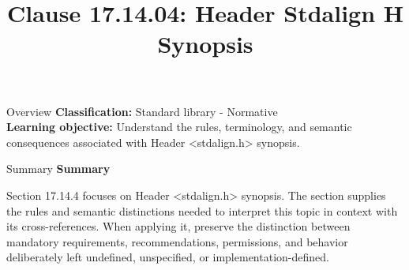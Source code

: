 \documentclass[10pt,letterpaper]{article}
\title{Clause 17.14.04: Header Stdalign H Synopsis}
\author{}
\date{}
\begin{document}
\maketitle
\begin{CornellOverviewBox}{Overview}
\textbf{Classification:} Standard library - Normative\\[2pt]
\textbf{Learning objective:} Understand the rules, terminology, and semantic consequences associated with Header <stdalign.h> synopsis.
\end{CornellOverviewBox}\begin{CornellSummaryBox}{Summary}
{\sffamily\bfseries\color{Accent} Summary}\par\vspace{3pt}Section 17.14.4 focuses on Header <stdalign.h> synopsis. The section supplies the rules and semantic distinctions needed to interpret this topic in context with its cross-references. When applying it, preserve the distinction between mandatory requirements, recommendations, permissions, and behavior deliberately left undefined, unspecified, or implementation-defined.
\end{CornellSummaryBox}
\end{document}

